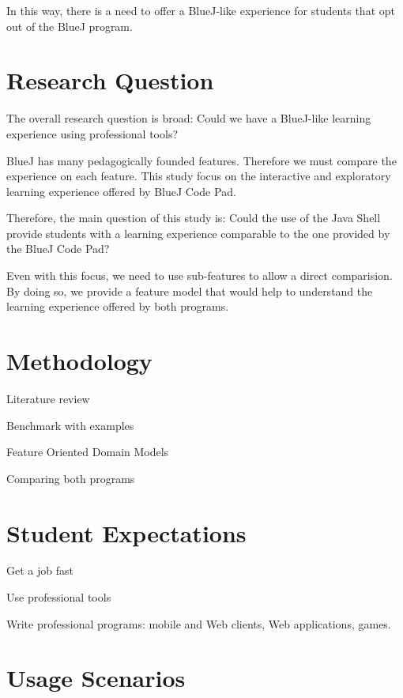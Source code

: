 \documentclass{article}
\begin{document}
In this way, there is a need to offer a BlueJ-like experience for students that opt out of the BlueJ program. 

\section{Research Question}

The overall research question is broad: Could we have a BlueJ-like learning experience using professional tools?

BlueJ has many pedagogically founded features. Therefore we must compare the experience on each feature. This study focus on the interactive and exploratory learning experience offered by BlueJ Code Pad.

Therefore, the main question of this study is:
Could the use of the Java Shell provide students with a learning experience comparable to the one provided by the BlueJ Code Pad?

Even with this focus, we need to use sub-features to allow a direct comparision. By doing so, we provide a feature model that would help to understand the learning experience offered by both programs.




\section{Methodology}

Literature review


Benchmark with examples

Feature Oriented Domain Models

Comparing both programs

\section{Student Expectations}

Get a job fast

Use professional tools

Write professional programs: mobile and Web clients, Web applications, games.

\section{Usage Scenarios}
\end{document}
